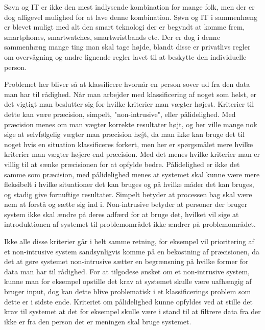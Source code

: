 \begin{comment}
Dette kapitel indeholder forskning omkring søvn, hvor forskellige metoder til at detektere søvn bliver beskrevet.
Hvorefter metoderne bliver sammenlignet med hinanden for at se på hvilket metoder vil kunne bruges til dette projekt.
Til slut vil der blive set på en enkelt metode i dybden som et proof of concept.
\end{comment}
Søvn og IT er ikke den mest indlysende kombination for mange folk, men der er dog alligevel mulighed for at lave denne kombination.
Søvn og IT i sammenhæng er blevet muligt med alt den smart teknologi der er begyndt at komme frem, smartphones, smartwatches, smartwristbands etc.
Der er dog i denne sammenhæng mange ting man skal tage højde, blandt disse er privatlivs regler om overvågning og andre lignende regler lavet til at beskytte den individuelle person.

Problemet her bliver så at klassificere hvornår en person sover ud fra den data man har til rådighed.
Når man arbejder med klassificering af noget som helst, er det vigtigt man beslutter sig for hvilke kriterier man vægter højest.
Kriterier til dette kan være præcision, simpelt, "non-intrusive", eller pålidelighed.
Med præcision menes om man vægter korrekte resultater højt, og her ville mange nok sige at selvfølgelig vægter man præcision højt, da man ikke kan bruge det til noget hvis en situation klassificeres forkert, men her er spørgsmålet mere hvilke kriterier man vægter højere end præcision.
Med det menes hvilke kriterier man er villig til at sænke præcisionen for at opfylde bedre.
Pålidelighed er ikke det samme som præcision, med pålidelighed menes at systemet skal kunne være mere fleksibelt i hvilke situationer det kan bruges og på hvilke måder det kan bruges, og stadig give fornuftige resultater.
Simpelt betyder at processen bag skal være nem at forstå og sætte sig ind i.
Non-intrusive betyder at personer der bruger system ikke skal ændre på deres adfærd for at bruge det, hvilket vil sige at introduktionen af systemet til problemområdet ikke ændrer på problemområdet.

Ikke alle disse kriterier går i helt samme retning, for eksempel vil prioritering af et non-intrusive system sandsynligvis komme på en bekostning af præcisionen, da det at gøre systemet non-intrusive sætter en begrænsning på hvilke former for data man har til rådighed.
For at tilgodese ønsket om et non-intrusive system, kunne man for eksempel opstille det krav at systemet skulle være uafhængig af bruger input, dog kan dette blive problematisk i et klassificerings problem som dette er i sidste ende.
Kriteriet om pålidelighed kunne opfyldes ved at stille det krav til systemet at det for eksempel skulle være i stand til at filtrere data fra der ikke er fra den person det er meningen skal bruge systemet.

